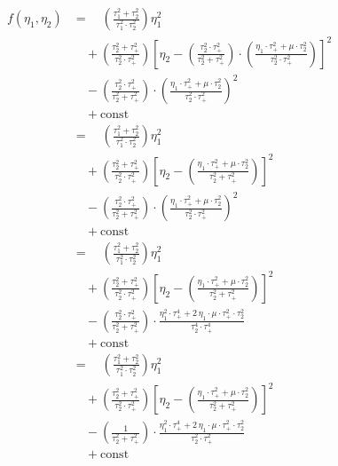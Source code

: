 \documentclass[11pt, oneside]{article}
\begin{document}
\begin{align*}
f(\eta_{1}, \eta_{2})
&= \quad
\left( \frac{ \tau_{1}^{2} + \tau_{2}^{2} }{ \tau_{1}^{2} \cdot \tau_{2}^{2} } \right) \eta_{1}^{2}
\\
&\quad +
\left( \frac{ \tau_{2}^{2} + \tau_{+}^{2} }{ \tau_{2}^{2} \cdot \tau_{+}^{2} } \right)
\left[ \eta_{2} - 
\left( \frac{ \tau_{2}^{2} \cdot \tau_{+}^{2} }{ \tau_{2}^{2} + \tau_{+}^{2} } \right) \cdot
\left( \frac{ \eta_{1} \cdot \tau_{+}^{2} + \mu \cdot \tau_{2}^{2} }{ \tau_{2}^{2} \cdot \tau_{+}^{2} } \right) \right]^{2}
\\
&\quad -
\left( \frac{ \tau_{2}^{2} \cdot \tau_{+}^{2} }{ \tau_{2}^{2} + \tau_{+}^{2} } \right) \cdot
\left( \frac{ \eta_{1} \cdot \tau_{+}^{2} + \mu \cdot \tau_{2}^{2} }{ \tau_{2}^{2} \cdot \tau_{+}^{2} } \right)^{2}
\\
&\quad +
\mathrm{const}
\\
&= \quad
\left( \frac{ \tau_{1}^{2} + \tau_{2}^{2} }{ \tau_{1}^{2} \cdot \tau_{2}^{2} } \right) \eta_{1}^{2}
\\
&\quad +
\left( \frac{ \tau_{2}^{2} + \tau_{+}^{2} }{ \tau_{2}^{2} \cdot \tau_{+}^{2} } \right)
\left[ \eta_{2} -
\left( \frac{ \eta_{1} \cdot \tau_{+}^{2} + \mu \cdot \tau_{2}^{2} }{ \tau_{2}^{2} + \tau_{+}^{2} } \right) \right]^{2}
\\
&\quad -
\left( \frac{ \tau_{2}^{2} \cdot \tau_{+}^{2} }{ \tau_{2}^{2} + \tau_{+}^{2} } \right) \cdot
\left( \frac{ \eta_{1} \cdot \tau_{+}^{2} + \mu \cdot \tau_{2}^{2} }{ \tau_{2}^{2} \cdot \tau_{+}^{2} } \right)^{2}
\\
&\quad +
\mathrm{const}
\\
&= \quad
\left( \frac{ \tau_{1}^{2} + \tau_{2}^{2} }{ \tau_{1}^{2} \cdot \tau_{2}^{2} } \right) \eta_{1}^{2}
\\
&\quad +
\left( \frac{ \tau_{2}^{2} + \tau_{+}^{2} }{ \tau_{2}^{2} \cdot \tau_{+}^{2} } \right)
\left[ \eta_{2} -
\left( \frac{ \eta_{1} \cdot \tau_{+}^{2} + \mu \cdot \tau_{2}^{2} }{ \tau_{2}^{2} + \tau_{+}^{2} } \right) \right]^{2}
\\
&\quad -
\left( \frac{ \tau_{2}^{2} \cdot \tau_{+}^{2} }{ \tau_{2}^{2} + \tau_{+}^{2} } \right) \cdot
\frac{ \eta_{1}^{2} \cdot \tau_{+}^{4} + 2 \, \eta_{1} \cdot \mu \cdot \tau_{+}^{2} \cdot \tau_{2}^{2}}{ \tau_{2}^{4} \cdot \tau_{+}^{4} } 
\\
&\quad +
\mathrm{const}
\\
&= \quad
\left( \frac{ \tau_{1}^{2} + \tau_{2}^{2} }{ \tau_{1}^{2} \cdot \tau_{2}^{2} } \right) \eta_{1}^{2}
\\
&\quad +
\left( \frac{ \tau_{2}^{2} + \tau_{+}^{2} }{ \tau_{2}^{2} \cdot \tau_{+}^{2} } \right)
\left[ \eta_{2} -
\left( \frac{ \eta_{1} \cdot \tau_{+}^{2} + \mu \cdot \tau_{2}^{2} }{ \tau_{2}^{2} + \tau_{+}^{2} } \right) \right]^{2}
\\
&\quad -
\left( \frac{ 1 }{ \tau_{2}^{2} + \tau_{+}^{2} } \right) \cdot
\frac{ \eta_{1}^{2} \cdot \tau_{+}^{4} + 2 \, \eta_{1} \cdot \mu \cdot \tau_{+}^{2} \cdot \tau_{2}^{2}}{ \tau_{2}^{2} \cdot \tau_{+}^{2} } 
\\
&\quad +
\mathrm{const}
\end{align*}
\end{document}
